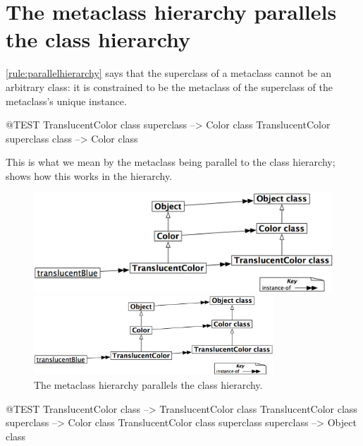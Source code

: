 \documentclass[a4paper,10pt,twoside]{book}
\begin{document}
\section{The metaclass hierarchy parallels the class hierarchy}

\ref{rule:parallelhierarchy} says that the superclass of a metaclass cannot be an arbitrary class: it is constrained to be the metaclass of the superclass of the metaclass's unique instance.

\begin{code}{@TEST}
TranslucentColor class superclass --> Color class
TranslucentColor superclass class --> Color class
\end{code}

\noindent
This is what we mean by the metaclass  being parallel to the class hierarchy;   shows how this works in the  hierarchy.

\begin{center}
\begin{figure}[!ht]
\ifluluelse
	{\centerline {\includegraphics[width=\textwidth]{TranslucentMetaclassHierarchy}}}
	{\centerline {\includegraphics[width=0.8\textwidth]{TranslucentMetaclassHierarchy}}}
\caption{The metaclass hierarchy parallels the class hierarchy.\label{fig:parallelHierarchies}}
\end{figure}
\end{center}

\begin{code}{@TEST}
TranslucentColor class                                     --> TranslucentColor class
TranslucentColor class superclass                   --> Color class
TranslucentColor class superclass superclass --> Object class
\end{code}
\end{document}
